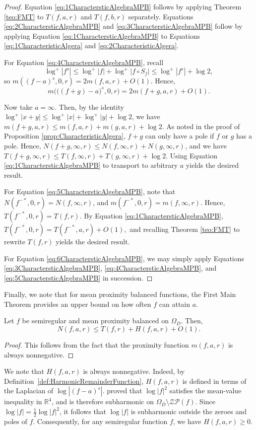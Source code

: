 \documentclass{amsart}
\begin{document}
\begin{proof}
Equation \ref{eq:1CharactersticAlgebraMPB} follows by applying Theorem \ref{teo:FMT} to $T(f,a,r)$ and $T(f,b,r)$ separately. Equations \ref{eq:2CharactersticAlgebraMPB} and \ref{eq:3CharactersticAlgebraMPB} follow by applying Equation \ref{eq:1CharactersticAlgebraMPB} to Equations \ref{eq:1CharacteristicAlgera} and \ref{eq:2CharacteristicAlgera}. 

For Equation \ref{eq:4CharactersticAlgebraMPB}, recall \[\log^+|f^s|\leq \log^+|f|+\log^+|f\circ S_f|\leq \log^+|f^s|+\log 2,\] so $m((f-a)^s,0,r)=2m(f,a,r)+O(1)$. Hence, \[m\bigg(\big((f+g)-a\big)^s,0,r\bigg)=2m(f+g,a,r)+O(1).\] 

Now take $a=\infty$. Then, by the identity $\log^+|x+y|\leq \log^+|x|+\log^+|y|+\log 2$, we have $m(f+g,a,r)\leq m(f,a,r)+m(g,a,r)+\log 2$. As noted in the proof of Proposition \ref{prop:CharacteristicAlgera}, $f+g$ can only have a pole if $f$ or $g$ has a pole. Hence, $N(f+g,\infty,r)\leq N(f,\infty, r)+N(g,\infty,r)$, and we have $T(f+g,\infty,r)\leq T(f,\infty,r)+T(g,\infty,r)+\log 2$. Using Equation \ref{eq:1CharactersticAlgebraMPB} to transport to arbitrary $a$ yields the desired result. 

For Equation \ref{eq:5CharactersticAlgebraMPB}, note that $N(f^{-*},0,r)=N(f,\infty,r)$, and $m(f^{-*},0,r)=m(f,\infty,r)$. Hence, $T(f^{-*},0,r)=T(f,r)$. By Equation \ref{eq:1CharactersticAlgebraMPB}, $T(f^{-*},0,r)=T(f^{-*},a,r)+O(1),$ and recalling Theorem \ref{teo:FMT} to rewrite $T(f,r)$ yields the desired result.

For Equation \ref{eq:6CharactersticAlgebraMPB}, we may simply apply Equations \ref{eq:3CharactersticAlgebraMPB}, \ref{eq:4CharactersticAlgebraMPB}, and \ref{eq:5CharactersticAlgebraMPB} in succession. 
\end{proof}

Finally, we note that for mean proximity balanced functions, the First Main Theorem provides an upper bound on how often $f$ can attain $a$. 

\begin{prop}
    Let $f$ be semiregular and mean proximity balanced on $\Omega_D$. Then, \[N(f,a,r)\leq T(f,r)+H(f,a,r)+O(1).\]
\end{prop}
\begin{proof}
    This follows from the fact that the proximity function $m(f,a,r)$ is always nonnegative. 
\end{proof}

\begin{remark}
We note that $H(f,a,r)$ is always nonnegative. Indeed, by Definition~\ref{def:HarmonicRemainderFunction}, $H(f,a,r)$ is defined in terms of the Laplacian of $\log|(f-a)^s|$. \cite[Proposition 8.4]{Bisi2021} proved that $\log|f|^2$ satisfies the mean-value inequality in $\mathbb{R}^4$, and is therefore subharmonic on $\Omega_D \setminus \mathcal{ZP}(f)$. Since $\log|f| = \frac{1}{2}\log|f|^2$, it follows that $\log|f|$ is subharmonic outside the zeroes and poles of $f$. Consequently, for any semiregular function $f$, we have $H(f,a,r) \ge 0$.
\end{remark}
\end{document}
